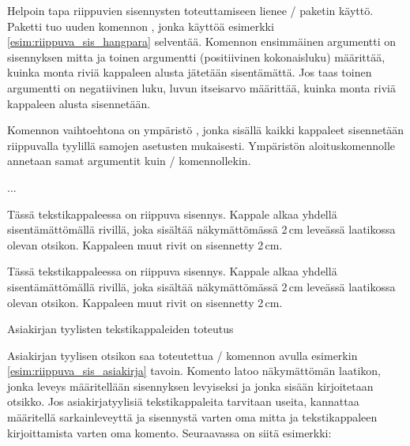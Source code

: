 Helpoin tapa riippuvien sisennysten toteuttamiseen lienee
\-/ paketin käyttö. Paketti tuo uuden
komennon , jonka käyttöä esimerkki
\ref{esim:riippuva_sis_hangpara} selventää. Komennon ensimmäinen
argumentti on sisennyksen mitta ja toinen argumentti (positiivinen
kokonaisluku) määrittää, kuinka monta riviä kappaleen alusta jätetään
sisentämättä. Jos taas toinen argumentti on negatiivinen luku, luvun
itseisarvo määrittää, kuinka monta riviä kappaleen alusta sisennetään.

Komennon  vaihtoehtona on ympäristö
, jonka sisällä kaikki kappaleet sisennetään
riippuvalla tyylillä samojen asetusten mukaisesti. Ympäristön
aloituskomennolle annetaan samat argumentit kuin \-/
komennollekin.

\begin{koodilohkosis}
\begin{hangparas}{2cm}{1}
  ...
\end{hangparas}
\end{koodilohkosis}

\begin{esimerkki*}
  \komentoi{,}

\begin{koodilohko}
Tässä tekstikappaleessa on
riippuva sisennys. Kappale alkaa yhdellä sisentämättömällä rivillä,
joka sisältää näkymättömässä 2\,cm leveässä laatikossa olevan otsikon.
Kappaleen muut rivit on sisennetty 2\,cm.
\end{koodilohko}
  \begin{tulos}
    Tässä tekstikappaleessa on
    riippuva sisennys. Kappale alkaa yhdellä sisentämättömällä rivillä,
    joka sisältää näkymättömässä 2\,cm leveässä laatikossa olevan otsikon.
    Kappaleen muut rivit on sisennetty 2\,cm.
  \end{tulos}
  \caption{Asiakirjan tyylisten tekstikappaleiden toteutus}
  \label{esim:riippuva_sis_asiakirja}
\end{esimerkki*}

Asiakirjan tyylisen otsikon saa toteutettua \-/
komennon avulla esimerkin \ref{esim:riippuva_sis_asiakirja} tavoin.
Komento latoo näkymättömän laatikon, jonka leveys määritellään
sisennyksen levyiseksi ja jonka sisään kirjoitetaan otsikko. Jos
asiakirjatyylisiä tekstikappaleita tarvitaan useita, kannattaa
määritellä sarkainleveyttä ja sisennystä varten oma mitta ja
tekstikappaleen kirjoittamista varten oma komento. Seuraavassa on siitä
esimerkki:

